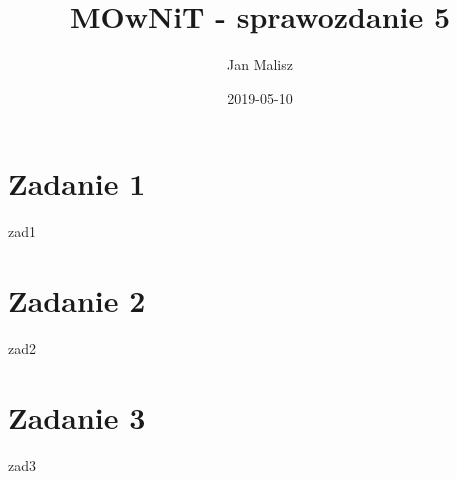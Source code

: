 \documentclass[10pt,a4paper]{article}
\title{MOwNiT - sprawozdanie 5}
\author{Jan Malisz}
\date{2019-05-10}
\begin{document}
  \maketitle
  \thispagestyle{empty}
  \newpage

  \section*{Zadanie 1}\label{sec:Zadanie1}
  {zad1}

  \section*{Zadanie 2}\label{sec:Zadanie2}
  {zad2}

  \section*{Zadanie 3}\label{sec:Zadanie3}
  {zad3}
\end{document}

